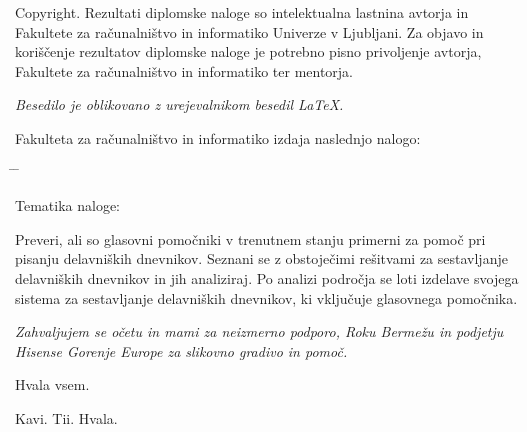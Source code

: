 \documentclass[a4paper, 12pt]{book}
\newcommand{\clearemptydoublepage}{\newpage{\pagestyle{empty}\cleardoublepage}}
\begin{document}
\noindent
{\sc Copyright}. 
Rezultati diplomske naloge so intelektualna lastnina avtorja in Fakultete za računalništvo in informatiko Univerze v Ljubljani.
Za objavo in koriščenje rezultatov diplomske naloge je potrebno pisno privoljenje avtorja, Fakultete za računalništvo in informatiko ter mentorja.

\begin{center}
\mbox{}\vfill
\emph{Besedilo je oblikovano z urejevalnikom besedil \LaTeX.}
\end{center}
\clearemptydoublepage

\thispagestyle{empty}
\vspace*{4cm}

\noindent
Fakulteta za računalništvo in informatiko izdaja naslednjo nalogo:
\medskip
\begin{tabbing}
\hspace{32mm}\= \hspace{6cm} \= \kill




Tematika naloge:
\end{tabbing}
Preveri, ali so glasovni pomočniki v trenutnem stanju primerni za pomoč pri pisanju delavniških dnevnikov.
Seznani se z obstoječimi rešitvami za sestavljanje delavniških dnevnikov in jih analiziraj.
Po analizi področja se loti izdelave svojega sistema za sestavljanje delavniških dnevnikov, ki vključuje glasovnega pomočnika.
\vspace{15mm}



\vspace{2cm}

\clearemptydoublepage

\thispagestyle{empty}\mbox{}\vfill\null\it%
\noindent
Zahvaljujem se očetu in mami za neizmerno podporo, Roku Bermežu in podjetju Hisense Gorenje Europe za slikovno gradivo in pomoč.

Hvala vsem.
\rm\normalfont

\clearemptydoublepage

\thispagestyle{empty}\mbox{}{\textheight}\mbox{}\hfill\begin{minipage}{0.55\textwidth}%
	Kavi. Tii. Hvala.
\normalfont\end{minipage}
\end{document}
